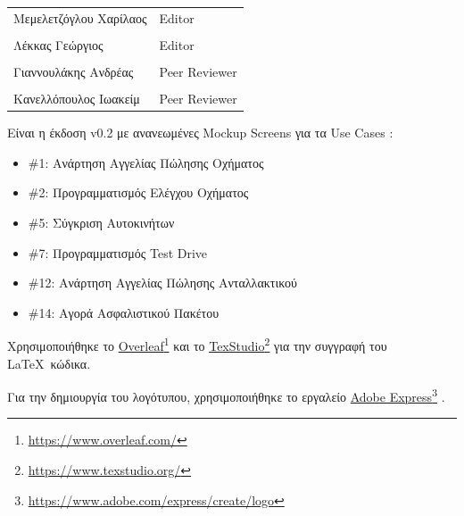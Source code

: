 \documentclass{../ol-softwaremanual}
\newcommand{\doclink}[2]{\href{#1}{#2}\footnote{\url{#1}}}
\begin{document}
	
	\vspace{20pt}
	
	\begin{table}[htbp!]
		\begin{tabular}{ll}
			Μεμελετζόγλου Χαρίλαος & \en Editor \\
			\\ Λέκκας Γεώργιος      &   \en  Editor \\
			\\ Γιαννουλάκης Ανδρέας & \en Peer Reviewer \\
			\\ Κανελλόπουλος Ιωακείμ & \en Peer Reviewer
		\end{tabular}
	\end{table}
	
	\vspace{10pt}
	
	Είναι η έκδοση \en v0.2 \gr με ανανεωμένες \en Mockup Screens \gr για τα \en Use Cases \gr :
	
	\begin{itemize}
		\item \en \#1: \gr  Ανάρτηση Αγγελίας Πώλησης Οχήματος
		\item  \en \#2: \gr Προγραμματισμός Ελέγχου Οχήματος
		\item \en \#5: \gr Σύγκριση Αυτοκινήτων
		\item \en \#7: \gr Προγραμματισμός \en Test Drive \gr
		\item \en \#12: \gr Ανάρτηση Αγγελίας Πώλησης Ανταλλακτικού
		\item \en \#14: \gr Αγορά Ασφαλιστικού Πακέτου 
	\end{itemize}
	
	\newpage
	
	
	
	
	\vspace{20pt}
	\flushleft
	
	Χρησιμοποιήθηκε το \en \doclink{https://www.overleaf.com/}{Overleaf} \gr και το \en \doclink{https://www.texstudio.org/}{TexStudio} \gr για την συγγραφή του \LaTeX\ κώδικα. \break
	
	Για την δημιουργία του λογότυπου, χρησιμοποιήθηκε το εργαλείο \en \doclink{https://www.adobe.com/express/create/logo}{Adobe Express} . \gr \break
	
\end{document}
